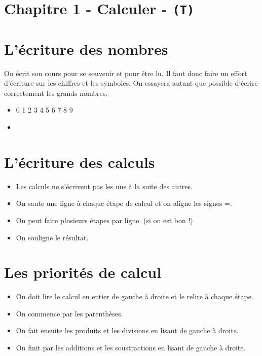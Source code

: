 



\horrule{2px}
\section*{Chapitre 1 - Calculer - \texttt{(T)}}
\horrule{2px}

\section*{L'écriture des nombres}

On écrit son cours pour se souvenir et pour être lu. Il faut donc faire un effort d'écriture sur les chiffres et les symboles. On essayera autant que possible d'écrire correctement les grands nombres. 

\begin{itemize}
  \item 0 1 2 3 4 5 6 7 8 9
  \item {}
\end{itemize} 


\section*{L'écriture des calculs}

\begin{itemize}
  \item Les calculs ne s'écrivent pas les uns à la suite des autres. 
  \item On saute une ligne à chaque étape de calcul et on aligne les signes =.
  \item On peut faire plusieurs étapes par ligne. (si on est bon !)
  \item On souligne le résultat.
\end{itemize}

\section*{Les priorités de calcul}

\begin{itemize}
  \item On doit lire le calcul en entier de gauche à droite et le relire à chaque étape.
  \item On commence par les parenthèses.
  \item On fait ensuite les produits et les divisions en lisant de gauche à droite.
  \item On finit par les additions et les soustractions en lisant de gauche à droite.
\end{itemize}


